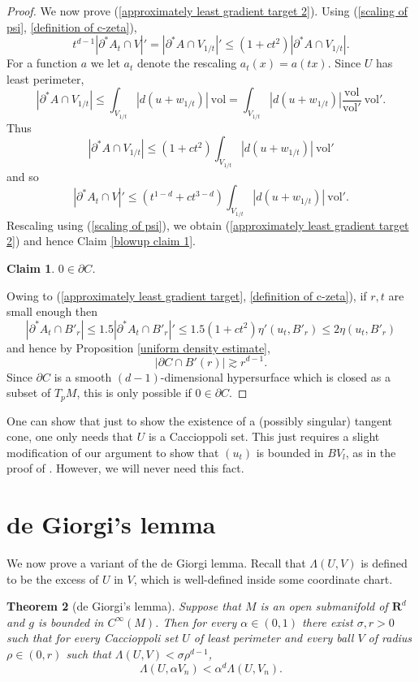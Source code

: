 \documentclass[reqno,12pt,letterpaper]{amsart}
\newcommand{\RR}{\mathbf{R}}
\newcommand{\vol}{\mathrm{vol}}
\newtheorem{theorem}{Theorem}[section]
\newtheorem{claim}[theorem]{Claim}
\theoremstyle{definition}
\numberwithin{equation}{section}
\begin{document}
\begin{proof}
We now prove (\ref{approximately least gradient target 2}).
Using (\ref{scaling of psi}, \ref{definition of c-zeta}),
$$t^{d - 1} | \partial^* A_t \cap V|' = |\partial^* A \cap V_{1/t}|' \leq (1 + ct^2) |\partial^* A \cap V_{1/t}|.$$
For a function $a$ we let $a_t$ denote the rescaling $a_t(x) = a(tx)$.
Since $U$ has least perimeter,
$$|\partial^* A \cap V_{1/t}| \leq \int_{V_{1/t}} |d(u + w_{1/t})| ~\vol = \int_{V_{1/t}} |d(u + w_{1/t})| \frac{\vol}{\vol'} ~\vol'.$$
Thus
$$|\partial^* A \cap V_{1/t}| \leq (1 + ct^2) \int_{V_{1/t}} |d(u + w_{1/t})| ~\vol'$$
and so
$$|\partial^* A_t \cap V|' \leq (t^{1 - d} + ct^{3 - d}) \int_{V_{1/t}} |d(u + w_{1/t})| ~\vol'.$$
Rescaling using (\ref{scaling of psi}), we obtain (\ref{approximately least gradient target 2}) and hence Claim \ref{blowup claim 1}.

\begin{claim}
$0 \in \partial C$.
\end{claim}

Owing to (\ref{approximately least gradient target}, \ref{definition of c-zeta}), if $r,t$ are small enough then
$$|\partial^* A_t \cap B'_r| \leq 1.5|\partial^* A_t \cap B'_r|' \leq 1.5(1 + ct^2) \eta'(u_t, B'_r) \leq 2 \eta(u_t, B'_r)$$
and hence by Proposition \ref{uniform density estimate},
$$|\partial C \cap B'(r)| \gtrsim r^{d - 1}.$$
Since $\partial C$ is a smooth $(d-1)$-dimensional hypersurface which is closed as a subset of $T_pM$, this is only possible if $0 \in \partial C$.
\end{proof}

One can show that just to show the existence of a (possibly singular) tangent cone, one only needs that $U$ is a Caccioppoli set.
This just requires a slight modification of our argument to show that $(u_t)$ is bounded in $BV_l$, as in the proof of \cite[Theorem 9.3]{Giusti77}.
However, we will never need this fact.


\section{de Giorgi's lemma}\label{DGL section}
We now prove a variant of the de Giorgi lemma. Recall that $\Lambda(U, V)$ is defined to be the excess of $U$ in $V$, which is well-defined inside some coordinate chart.

\begin{theorem}[de Giorgi's lemma]\label{DGL}
Suppose that $M$ is an open submanifold of $\RR^d$ and $g$ is bounded in $C^\infty(M)$.
Then for every $\alpha \in (0, 1)$ there exist $\sigma, r > 0$ such that for every Caccioppoli set $U$ of least perimeter and every ball $V$ of radius $\rho \in (0, r)$ such that $\Lambda(U, V) < \sigma \rho^{d - 1}$,
$$\Lambda(U, \alpha V_n) < \alpha^d \Lambda(U, V_n).$$
\end{theorem}
\end{document}
